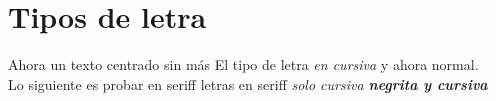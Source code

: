 \documentclass[10pt,a4paper]{report}
\begin{document}
\section{Tipos de letra}Ahora un texto centrado sin más
El tipo de letra {\em en cursiva } y ahora normal.\\
Lo siguiente es probar en seriff
{\sf letras en seriff
 {\em solo cursiva
 	\bf
 		negrita y cursiva
 	}
 } 
\end{document}
